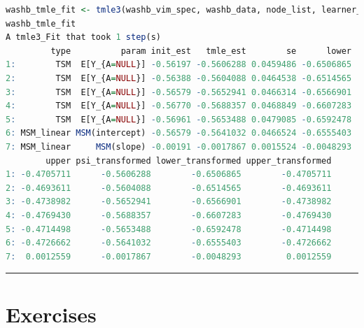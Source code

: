 \documentclass[
  12pt, krantz2,
]{book}
\theoremstyle{definition}
\theoremstyle{definition}
\theoremstyle{definition}
\newcommand{\1}{\mathbbm{1}}
\begin{document}
\begin{lstlisting}[language=R]
washb_tmle_fit <- tmle3(washb_vim_spec, washb_data, node_list, learner_list)
washb_tmle_fit
A tmle3_Fit that took 1 step(s)
         type          param init_est   tmle_est        se      lower
1:        TSM  E[Y_{A=NULL}] -0.56197 -0.5606288 0.0459486 -0.6506865
2:        TSM  E[Y_{A=NULL}] -0.56388 -0.5604088 0.0464538 -0.6514565
3:        TSM  E[Y_{A=NULL}] -0.56579 -0.5652941 0.0466314 -0.6566901
4:        TSM  E[Y_{A=NULL}] -0.56770 -0.5688357 0.0468849 -0.6607283
5:        TSM  E[Y_{A=NULL}] -0.56961 -0.5653488 0.0479085 -0.6592478
6: MSM_linear MSM(intercept) -0.56579 -0.5641032 0.0466524 -0.6555403
7: MSM_linear     MSM(slope) -0.00191 -0.0017867 0.0015524 -0.0048293
        upper psi_transformed lower_transformed upper_transformed
1: -0.4705711      -0.5606288        -0.6506865        -0.4705711
2: -0.4693611      -0.5604088        -0.6514565        -0.4693611
3: -0.4738982      -0.5652941        -0.6566901        -0.4738982
4: -0.4769430      -0.5688357        -0.6607283        -0.4769430
5: -0.4714498      -0.5653488        -0.6592478        -0.4714498
6: -0.4726662      -0.5641032        -0.6555403        -0.4726662
7:  0.0012559      -0.0017867        -0.0048293         0.0012559
\end{lstlisting}

\begin{center}\rule{0.5\linewidth}{0.5pt}\end{center}

\hypertarget{exercises-1}{%
\section{Exercises}\label{exercises-1}}
\end{document}
